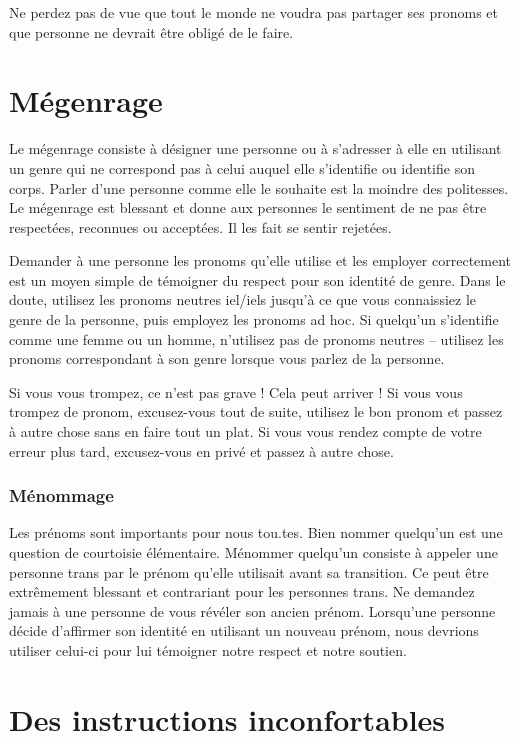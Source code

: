 \documentclass[12pt,openany]{book}
\begin{document}
Ne perdez pas de vue que tout le monde ne voudra pas partager ses pronoms et que personne ne devrait être obligé de le faire.

\section*{Mégenrage}

\noindent Le mégenrage consiste à désigner une personne ou à s’adresser à elle en utilisant un genre qui ne correspond pas à celui auquel elle s’identifie ou identifie son corps. Parler d’une personne comme elle le souhaite est la moindre des politesses. Le mégenrage est blessant et donne aux personnes le sentiment de ne pas être respectées, reconnues ou acceptées. Il les fait se sentir rejetées.

Demander à une personne les pronoms qu’elle utilise et les employer correctement est un moyen simple de témoigner du respect pour son identité de genre. Dans le doute, utilisez les pronoms neutres iel/iels jusqu’à ce que vous connaissiez le genre de la personne, puis employez les pronoms ad hoc. Si quelqu’un s’identifie comme une femme ou un homme, n’utilisez pas de pronoms neutres – utilisez les pronoms correspondant à son genre lorsque vous parlez de la personne.

Si vous vous trompez, ce n’est pas grave ! Cela peut arriver ! Si vous vous trompez de pronom, excusez-vous tout de suite, utilisez le bon pronom et passez à autre chose sans en faire tout un plat. Si vous vous rendez compte de votre erreur plus tard, excusez-vous en privé et passez à autre chose.

\subsubsection*{Ménommage}

\noindent Les prénoms sont importants pour nous tou.tes. Bien nommer quelqu’un est une question de courtoisie élémentaire. Ménommer quelqu’un consiste à appeler une personne trans par le prénom qu’elle utilisait avant sa transition. Ce peut être extrêmement blessant et contrariant pour les personnes trans. Ne demandez jamais à une personne de vous révéler son ancien prénom. Lorsqu’une personne décide d’affirmer son identité en utilisant un nouveau prénom, nous devrions utiliser celui-ci pour lui témoigner notre respect et notre soutien.

\section*{Des instructions inconfortables}
\end{document}
